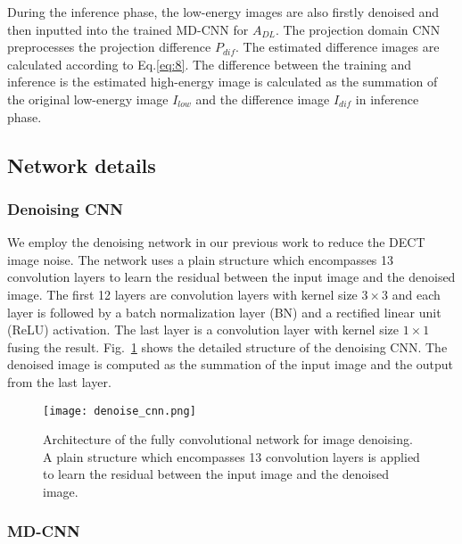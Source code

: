 \documentclass[journal,twoside,web]{ieeecolor}
\begin{document}
During the inference phase, the low-energy images are also firstly denoised and then inputted into the trained MD-CNN for \(A_{DL}\). The projection domain CNN preprocesses the projection difference \(P_{dif}\). The estimated difference images are calculated according to Eq.\eqref{eq:8}. The difference between the training and inference is the estimated high-energy image is calculated as the summation of the original low-energy image \(I_{low}\) and the difference image \(I_{dif}\) in inference phase.

\subsection{Network details}
\subsubsection{Denoising CNN}

We employ the denoising network in our previous work\cite{ref46} to reduce the DECT image noise. The network uses a plain structure which encompasses 13 convolution layers to learn the residual between the input image and the denoised image. The first 12 layers are convolution layers with kernel size \(3\times3\) and each layer is followed by a batch normalization layer (BN) and a rectified linear unit (ReLU) activation. The last layer is a convolution layer with kernel size \(1\times1\) fusing the result. Fig.~\ref{fig:2} shows the detailed structure of the denoising CNN. The denoised image is computed as the summation of the input image and the output from the last layer.

\begin{figure}[t]%
    \centering
        \texttt{[image: denoise\_cnn.png]}
        \caption{Architecture of the fully convolutional network for image denoising. A plain structure which encompasses 13 convolution layers is applied to learn the residual between the input image and the denoised image. }
    \label{fig:2}
\end{figure}

\subsubsection{MD-CNN}
\end{document}
